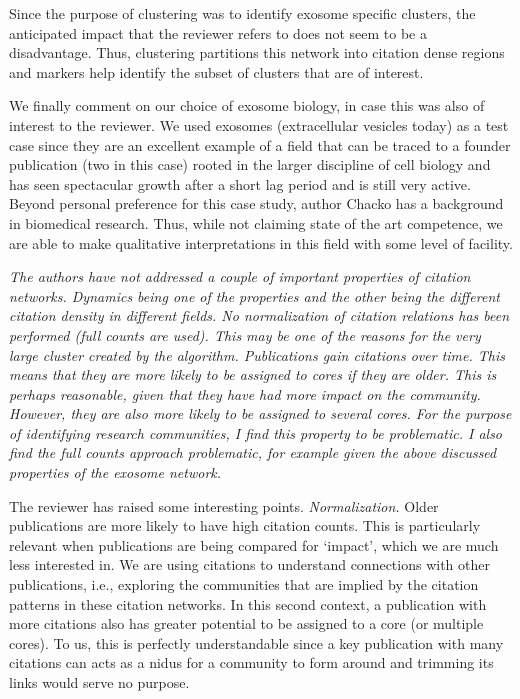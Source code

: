 \documentclass[11pt, oneside]{article}   	%
\begin{document}
Since the purpose of clustering was to identify exosome specific clusters, the anticipated impact that the reviewer refers to does not seem to be a disadvantage. Thus, clustering partitions this network into citation dense regions and markers help identify the subset of clusters that are of interest. 

We finally comment on our choice of exosome biology, in case this was also of interest to the reviewer. We used exosomes (extracellular vesicles today) as a test case since they are an excellent example of a field that can be traced to a founder publication (two in this case) rooted in the larger discipline of cell biology and has seen spectacular growth after a short lag period and is still very active. Beyond personal preference for this case study, author Chacko has a background in biomedical research. Thus, while not claiming state of the art competence, we are able to make qualitative interpretations in this field with some level of facility.  

\emph{The authors have not addressed a couple of important properties of citation networks. Dynamics being one of the properties and the other being the different citation density in different fields. No normalization of citation relations has been performed (full counts are used). This may be one of the reasons for the very large cluster created by the algorithm. Publications gain citations over time. This means that they are more likely to be assigned to cores if they are older. This is perhaps reasonable, given that they have had more impact on the community. However, they are also more likely to be assigned to several cores. For the purpose of identifying research communities, I find this property to be problematic. I also find the full counts approach problematic, for example given the above discussed properties of the exosome network.}

The reviewer has raised some interesting points. \emph{Normalization.} Older publications are more likely to have high citation counts. This is particularly relevant when publications are being compared for `impact', which we are much less interested in. We are using citations to understand connections with other publications, i.e., exploring the communities that are implied by the citation patterns in these citation networks. In this second context, a publication with more citations also has greater potential to be assigned to a core (or multiple cores). To us, this is perfectly understandable since a key publication with many citations can acts as a nidus for a community to form around and trimming its links would serve no purpose.  
\end{document}
